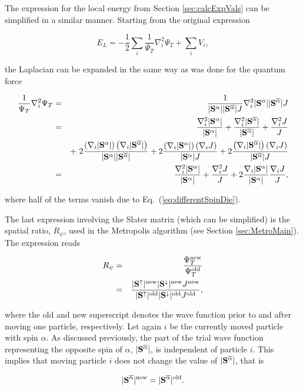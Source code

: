 The expression for the local energy from Section \ref{sec:calcExpVals} can be simplified in a similar manner. Starting from the original expression

\begin{equation}
 E_L = -\frac{1}{2}\sum_i \frac{1}{\Psi_T}\nabla^2_i \Psi_T + \sum_iV_i, \label{eq:localEsum}
\end{equation}

the Laplacian can be expanded in the same way as was done for the quantum force

 \begin{eqnarray}
  \frac{1}{\Psi_T}\nabla^2_i\Psi_T &=&  \frac{1}{|\mathbf{S}^{\alpha}||\mathbf{S}^{\overline{\alpha}}| J}\nabla^2_i |\mathbf{S}^{\alpha}||\mathbf{S}^{\overline{\alpha}}| J \nonumber\\
  &=& \frac{\nabla^2_i |\mathbf{S}^{\alpha}|}{|\mathbf{S}^{\alpha}|} + \frac{\nabla^2_i |\mathbf{S}^{\overline{\alpha}}|}{|\mathbf{S}^{\overline{\alpha}}|} + \frac{\nabla^2_i J}{J} \nonumber\\
  && +\,\, 2\frac{\left(\nabla_i|\mathbf{S}^{\alpha}|\right)\left(\nabla_i|\mathbf{S}^{\overline{\alpha}}|\right)}{|\mathbf{S}^{\alpha}||\mathbf{S}^{\overline{\alpha}}|} + 2 \frac{\left(\nabla_i|\mathbf{S}^{\alpha}|\right)\left(\nabla_i J\right)}{|\mathbf{S}^{\alpha}| J} + 2 \frac{\left(\nabla_i|\mathbf{S}^{\overline{\alpha}}|\right)\left(\nabla_i J\right)}{|\mathbf{S}^{\overline{\alpha}}| J} \nonumber\\
  &=& \frac{\nabla^2_i |\mathbf{S}^{\alpha}|}{|\mathbf{S}^{\alpha}|} + \frac{\nabla^2_i J}{J} + 2\frac{\nabla_i|\mathbf{S}^{\alpha}|}{|\mathbf{S}^{\alpha}|} \frac{\nabla_i J}{J},
\end{eqnarray}

where half of the terms vanish due to Eq.~(\ref{eq:differentSpinDie}).

The last expression involving the Slater matrix (which can be simplified) is the spatial ratio, $R_\psi$, used in the Metropolis algorithm (see Section \ref{sec:MetroMain}). The expression reads

\begin{eqnarray}
 R_\psi &=& \frac{\Psi_T^\mathrm{new}}{\Psi_T^\mathrm{old}} \nonumber\\
 &=& \frac{|\mathbf{S}^\uparrow|^\mathrm{new} |\mathbf{S}^\downarrow|^\mathrm{new} J^\mathrm{new}}{|\mathbf{S}^\uparrow|^\mathrm{old} |\mathbf{S}^\downarrow|^\mathrm{old} J^\mathrm{old}}, \label{eq:R_psi_allspins}\\
\end{eqnarray}

where the old and new superscript denotes the wave function prior to and after moving one particle, respectively. Let again $i$ be the currently moved particle with spin $\alpha$. As discussed previously, the part of the trial wave function representing the opposite spin of $\alpha$, $|\mathbf{S}^{\overline{\alpha}}|$, is independent of particle $i$. This implies that moving particle $i$ does not change the value of $|\mathbf{S}^{\overline{\alpha}}|$, that is

\begin{equation}
 |\mathbf{S}^{\overline{\alpha}}|^\mathrm{new} = |\mathbf{S}^{\overline{\alpha}}|^\mathrm{old}.
\end{equation}

